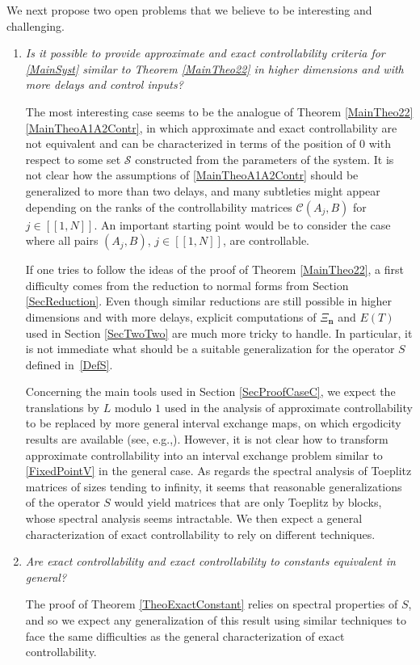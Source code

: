 \documentclass[JEP,XML,SOM,Unicode]{cedram}
\renewcommand{\eg}{e.g.,\xspace}
\newcommand{\bn}{\boldsymbol{n}}
\newcommand{\llbracket}{[\![}
\newcommand{\rrbracket}{]\!]}
\theoremstyle{plain}
\theoremstyle{definition}
\begin{document}
We next propose two open problems that we believe to be interesting and challenging.\enlargethispage{-.1\baselineskip}%

\begin{enumerate}
\item \emph{Is it possible to provide approximate and exact controllability criteria for \eqref{MainSyst} similar to Theorem \ref{MainTheo22} in higher dimensions and with more delays and control inputs?}

The most interesting case seems to be the analogue of Theorem \ref{MainTheo22}\eqref{MainTheoA1A2Contr}, in which approximate and exact controllability are not equivalent and can be characterized in terms of the position of $0$ with respect to some set $\mathcal S$ constructed from the parameters of the system. It is not clear how the assumptions of \eqref{MainTheoA1A2Contr} should be generalized to more than two delays, and many subtleties might appear depending on the ranks of the controllability matrices $\mathcal C(A_j, B)$ for $j \in \llbracket 1, N\rrbracket$. An important starting point would be to consider the case where all pairs $(A_j, B)$, $j \in \llbracket 1, N\rrbracket$, are controllable.

If one tries to follow the ideas of the proof of Theorem \ref{MainTheo22}, a first difficulty comes from the reduction to normal forms from Section \ref{SecReduction}. Even though similar reductions are still possible in higher dimensions and with more delays, explicit computations of $\Xi_{\bn}$ and $E(T)$ used in Section \ref{SecTwoTwo} are much more tricky to handle. In particular, it is not immediate what should be a suitable generalization for the operator $S$ defined in~\eqref{DefS}.

Concerning the main tools used in Section \ref{SecProofCaseC}, we expect the translations by $L$ modulo $1$ used in the analysis of approximate controllability to be replaced by more general interval exchange maps, on which ergodicity results are available (see, \hbox{\eg \cite{Viana2006Ergodic}}). However, it is not clear how to transform approximate controllability into an interval exchange problem similar to \eqref{FixedPointV} in the general case. As regards the spectral analysis of Toeplitz matrices of sizes tending to infinity, it seems that reasonable generalizations of the operator $S$ would yield matrices that are only Toeplitz by blocks, whose spectral analysis seems intractable. We then expect a general characterization of exact controllability to rely on different techniques.

\item \emph{Are exact controllability and exact controllability to constants equivalent in general?}

The proof of Theorem \ref{TheoExactConstant} relies on spectral properties of $S$, and so we expect any generalization of this result using similar techniques to face the same difficulties as the general characterization of exact controllability.
\end{enumerate}
\end{document}
